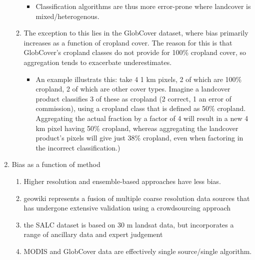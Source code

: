 \documentclass[11 pt]{article}
\begin{document}
\begin{enumerate}
\begin{enumerate}
       \begin{itemize} 
         \item Classification algorithms are thus more error-prone where landcover is mixed/heterogenous.
        \end{itemize}
      \item The exception to this lies in the GlobCover dataset, where bias primarily increases as a function of cropland cover. The reason for this is that GlobCover's cropland classes do not provide for 100\% cropland cover, so aggregation tends to exacerbate underestimates. 
      \begin{itemize} 
        \item An example illustrats this: take 4 1 km pixels, 2 of which are 100\% cropland, 2 of which are other cover types. Imagine a landcover product classifies 3 of these as cropland (2 correct, 1 an error of commission), using a cropland class that is defined as 50\% cropland. Aggregating the actual fraction by a factor of 4 will result in a new 4 km pixel having 50\% cropland, whereas aggregating the landcover product's pixels will give just 38\% cropland, even when factoring in the incorrect classification.)
        \end{itemize}
    \end{enumerate}
  \item Bias as a function of method
      \begin{enumerate}
      \item Higher resolution and ensemble-based approaches have less bias.
      \item geowiki represents a fusion of multiple coarse resolution data sources that has undergone extensive validation using a crowdsourcing approach
      \item the SALC dataset is based on 30 m landsat data, but incorporates a range of ancillary data and expert judgement
      \item MODIS and GlobCover data are effectively single source/single algorithm. 
    \end{enumerate}
\end{enumerate}
\end{document}
